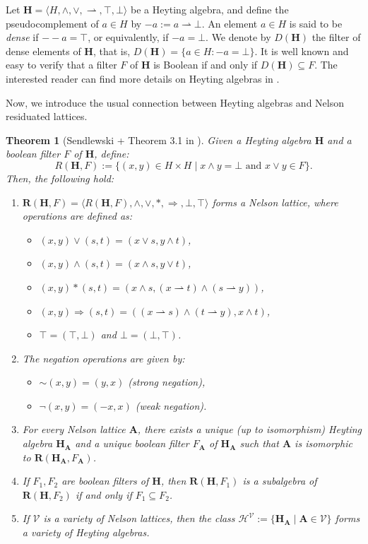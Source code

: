 \documentclass[pdflatex,sn-mathphys-num]{sn-jnl}%
\newcommand{\A}{\mathbf{A}}
\newcommand{\R}[2]{\mathbf{R}(#1,#2)}
\newcommand{\He}{\mathbf{H}}
\newcommand{\To}{\Rightarrow}
\newcommand{\RN}[2]{R(#1,#2)}
\theoremstyle{thmstyleone}%
\newtheorem{theorem}{Theorem}%
\theoremstyle{thmstyletwo}%
\theoremstyle{thmstylethree}%
\begin{document}
Let $\He=\langle H,\wedge,\vee,\rightharpoonup,\top,\bot\rangle$ be a Heyting algebra, and define the pseudocomplement of $a \in H$ by $-a := a \rightharpoonup \bot$.
An element $a \in H$ is said to be \emph{dense} if $--a = \top$, or equivalently, if $-a = \bot$. We denote by $D(\He)$ the filter of dense elements of $\He$, that is,  $D(\He) = \{a \in H : -a =\bot\}$.  It is well known and easy to verify that a filter $F$ of $\He$ is Boolean if and only if $D(\He) \subseteq F$. The interested reader can find more details on Heyting algebras in \cite{Ruth65}. 

Now, we introduce the usual connection between Heyting algebras and Nelson residuated lattices.

\begin{theorem}[Sendlewski + Theorem 3.1 in \cite{Busaniche}] \label{TwistRepresentation} 
Given a Heyting algebra $\He$ 
and a boolean filter $F$ of $\He$, define:
\[
\RN{\He}{F}:=\{(x,y)\in H\times H \mid x\wedge y=\bot \text{ and } x\vee y\in F\}.
\] 
Then, the following hold:
\begin{enumerate}
    \item $\R{\He}{F}=\langle \RN{\He}{F},\wedge,\vee, *, \To,\bot,\top\rangle$ forms a Nelson lattice, where operations are defined as:
    \begin{itemize}
        \item $(x,y)\vee(s,t)=(x\vee s,y\wedge t)$, 
        \item $(x,y)\wedge(s,t)=(x\wedge s,y\vee t)$,
        \item $(x,y)*(s,t)=(x\wedge s,(x \rightharpoonup t)\wedge (s\rightharpoonup y))$,
        \item $(x,y)\To (s,t)=((x\rightharpoonup s)\wedge(t\rightharpoonup y),x\wedge t)$, 
        \item $\top=(\top,\bot)$ and $\bot=(\bot,\top)$.
    \end{itemize}
    
    \item The negation operations are given by:
    \begin{itemize}
        \item $\sim (x,y)=(y,x)$ (strong negation),
        \item $\neg (x,y) = (-x, x)$ (weak negation).
    \end{itemize}

    \item For every Nelson lattice $\A$, there exists a unique (up to isomorphism) Heyting algebra $\He_\A$ and a unique boolean filter $F_\A$ of $\He_\A$ such that $\A$ is isomorphic to $\R{\He_\A}{F_\A}$.

    \item If $F_1,F_2$ are boolean filters of $\He$, then $\R{\He}{F_1}$ is a subalgebra of $\R{\He}{F_2}$ if and only if $F_1\subseteq F_2$.

    \item If $\mathcal{V}$ is a variety of Nelson lattices, then the class $\mathcal{H}^\mathcal{V} :=\{\He_\A \mid \A\in\mathcal{V}\}$ forms a variety of Heyting algebras.
\end{enumerate}
\end{theorem}
\end{document}
